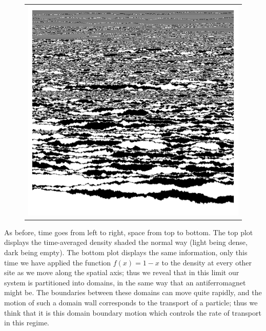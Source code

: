 \begin{figure}
\begin{center}
\begin{tabular}{c}
\includegraphics[width=0.8\linewidth]{numerics/images/stickyParticleFlows/aprilFlowDomains.png} \\
\end{tabular}
\end{center}
 \end{figure}
As before, time goes from left to right, space from top to bottom. 
The top plot displays the time-averaged density shaded the normal way (light being dense, dark being empty).
The bottom plot displays the same information, only this time we have applied the function $f(x) = 1-x$
to the density at every other site as we move along the spatial axis; thus we reveal that in this limit
our system is partitioned into domains, in the same way that an antiferromagnet might be. The boundaries
between these domains can move quite rapidly, and the motion of such a domain wall corresponds to the
transport of a particle; thus we think that it is this domain boundary motion which controls the rate
of transport in this regime.
 
 
